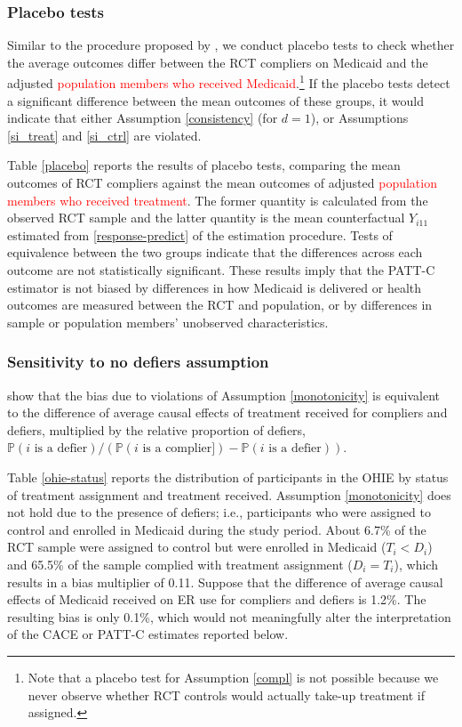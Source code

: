 \documentclass[hidelinks,12pt]{article}
\newcommand{\pr}{\mathbb{P}} %
\begin{document}
\subsubsection{Placebo tests} \label{placebo-tests}

Similar to the procedure proposed by \citep{Hartman}, we conduct placebo tests to check whether the average outcomes differ between the RCT compliers on Medicaid and the adjusted \textcolor{red}{population members who received Medicaid}.\footnote{Note that a placebo test for Assumption \eqref{compl} is not possible because we never observe whether RCT controls would actually take-up treatment if assigned.} If the placebo tests detect a significant difference between the mean outcomes of these groups, it would indicate that either Assumption \eqref{consistency} (for $d=1$), or Assumptions \eqref{si_treat} and \eqref{si_ctrl} are violated. 

Table \ref{placebo} reports the results of placebo tests, comparing the mean outcomes of RCT compliers against the mean outcomes of adjusted \textcolor{red}{population members who received treatment}. The former quantity is calculated from the observed RCT sample and the latter quantity is the mean counterfactual $Y_{i11}$ estimated from \ref{response-predict} of the estimation procedure. Tests of equivalence between the two groups indicate that the differences across each outcome are not statistically significant. These results imply that the PATT-C estimator is not biased by differences in how Medicaid is delivered or health outcomes are measured between the RCT and population, or by differences in sample or population members' unobserved characteristics. 

\subsubsection{Sensitivity to no defiers assumption} \label{sens-defiers}

\citet{Angrist1996} show that the bias due to violations of Assumption \eqref{monotonicity} is equivalent to the difference of average causal effects of treatment received for compliers and defiers, multiplied by the relative proportion of defiers, 
$\pr(i\text{ is a defier}) / (\pr(i\text{ is a complier]}) - \pr(i\text{ is a defier})).$

Table \ref{ohie-status} reports the distribution of participants in the OHIE by status of treatment assignment and treatment received. Assumption \eqref{monotonicity} does not hold due to the presence of defiers; i.e., participants who were assigned to control and enrolled in Medicaid during the study period. About 6.7\% of the RCT sample were assigned to control but were enrolled in Medicaid ($T_i < D_i$) and 65.5\% of the sample complied with treatment assignment ($D_i = T_i$), which results in a bias multiplier of 0.11. Suppose that the difference of average causal effects of Medicaid received on ER use for compliers and defiers is 1.2\%. The resulting bias is only 0.1\%, which would not meaningfully alter the interpretation of the CACE or PATT-C estimates reported below. 
 
\end{document}
